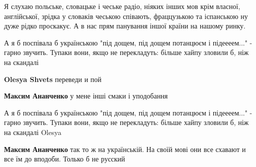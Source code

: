 \begin{itemize}
Я слухаю польське, словацьке і чеське радіо, ніяких інших мов крім власної,
англійської, зрідка у словаків чеською співають, фраццузькою та іспанською ну
дуже рідко проскакує. А в нас прям панування іншої країни на нашому ринку.

 

А я б поспівала б українською "під дощем, під дощем потанцюєм і підеееем..." -
гарно звучить. Тупаки вони, якщо не перекладуть: більше хайпу зловили б, ніж на
скандалі

\begin{itemize}
 
\textbf{Olesya Shvets} переведи и пой

\begin{itemize}
 
\textbf{Максим Ананченко} у мене інші смаки і уподобання

 

А я б поспівала б українською "під дощем, під дощем потанцюєм і підеееем..." -
гарно звучить. Тупаки вони, якщо не перекладуть: більше хайпу зловили б, ніж на
скандалі Olesya


 
\textbf{Максим Ананченко} так то ж на українській. На своїй мові они все схавают и все їм до вподоби. Только б не русский


\end{itemize}
\end{itemize}
\end{itemize}
